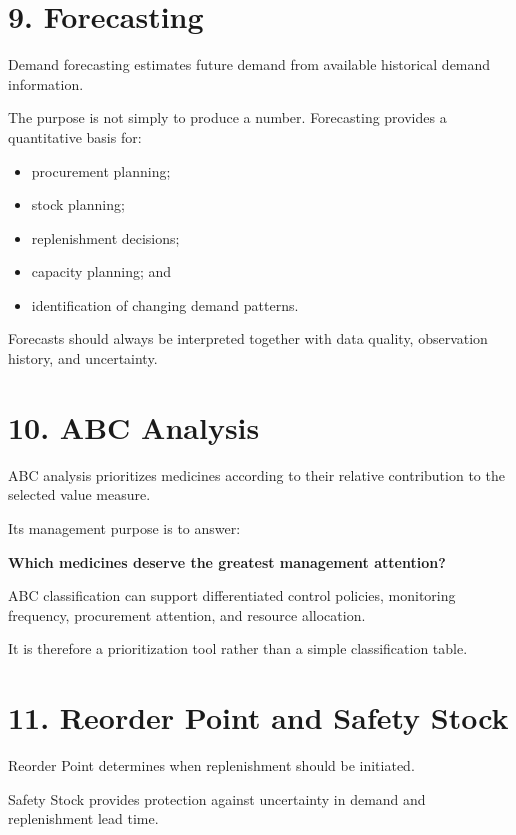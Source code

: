 \documentclass[12pt,a4paper]{article}
\begin{document}
\section*{9. Forecasting}

Demand forecasting estimates future demand from available historical demand information.

The purpose is not simply to produce a number. Forecasting provides a quantitative basis for:

\begin{itemize}[leftmargin=1cm]
\item procurement planning;
\item stock planning;
\item replenishment decisions;
\item capacity planning; and
\item identification of changing demand patterns.
\end{itemize}

Forecasts should always be interpreted together with data quality, observation history, and uncertainty.

\section*{10. ABC Analysis}

ABC analysis prioritizes medicines according to their relative contribution to the selected value measure.

Its management purpose is to answer:

\begin{center}
\textbf{Which medicines deserve the greatest management attention?}
\end{center}

ABC classification can support differentiated control policies, monitoring frequency, procurement attention, and resource allocation.

It is therefore a prioritization tool rather than a simple classification table.

\section*{11. Reorder Point and Safety Stock}

Reorder Point determines when replenishment should be initiated.

Safety Stock provides protection against uncertainty in demand and replenishment lead time.
\end{document}
